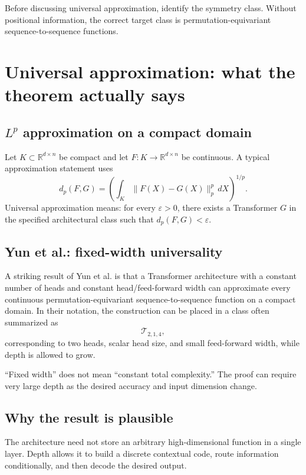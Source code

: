 \documentclass[11pt,a4paper,oneside,openany]{memoir}
\newcommand{\R}{\mathbb{R}}
\theoremstyle{definition}
\begin{document}
\begin{presentbox}
Before discussing universal approximation, identify the symmetry class.  Without positional information, the correct target class is permutation-equivariant sequence-to-sequence functions.
\end{presentbox}

\chapter{Universal approximation: what the theorem actually says}
\section{$L^p$ approximation on a compact domain}
Let $K\subset\R^{d\times n}$ be compact and let $F:K\to\R^{d\times n}$ be continuous.  A typical approximation statement uses
\[
d_p(F,G)=\left(\int_K\|F(X)-G(X)\|_p^p\,dX\right)^{1/p}.
\]
Universal approximation means: for every $\varepsilon>0$, there exists a Transformer $G$ in the specified architectural class such that $d_p(F,G)<\varepsilon$.

\section{Yun et al.: fixed-width universality}
A striking result of Yun et al. is that a Transformer architecture with a constant number of heads and constant head/feed-forward width can approximate every continuous permutation-equivariant sequence-to-sequence function on a compact domain.  In their notation, the construction can be placed in a class often summarized as
\[
\mathcal T_{2,1,4},
\]
corresponding to two heads, scalar head size, and small feed-forward width, while depth is allowed to grow.

\begin{warningbox}
``Fixed width'' does not mean ``constant total complexity.''  The proof can require very large depth as the desired accuracy and input dimension change.
\end{warningbox}

\section{Why the result is plausible}
The architecture need not store an arbitrary high-dimensional function in a single layer.  Depth allows it to build a discrete contextual code, route information conditionally, and then decode the desired output.
\end{document}
